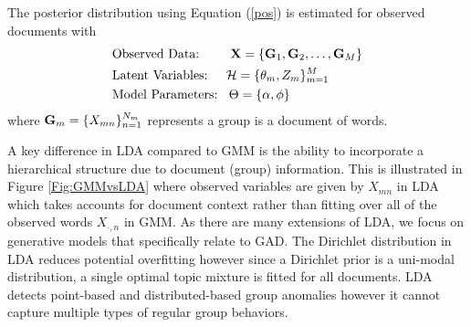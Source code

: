  The  posterior distribution using Equation (\ref{pos}) is estimated for observed documents   with 
 \begin{align*}
& \mbox{Observed Data:  \;\; \quad}  {\bf X}= \{{\bf G}_{1},{\bf G}_{2},\dots,{\bf G}_{M} \}\\
 & \mbox{Latent Variables: \quad}    \mathcal{H}=\{\theta_{m},Z_{m} \}_{m=1}^M  \\
 & \mbox{Model Parameters: \;\,}  \Theta=\{\alpha,\phi\} 
 \end{align*} 
   where ${\bf G}_{m} = \{ X_{mn} \}_{n=1}^{N_{m}}$ represents a group is a document of words.    
 
 
  A key difference in LDA compared to GMM is  the ability to incorporate a hierarchical structure due to document (group) information. This is illustrated in Figure \ref{Fig:GMMvsLDA} where observed variables are given by $X_{mn}$ in LDA which takes accounts for document context rather than fitting over all of the observed words $X_{\cdot,n}$ in GMM.  %
As there are many extensions of LDA, we focus on generative models that  specifically relate to  GAD. %
The Dirichlet distribution in LDA reduces potential overfitting however since a Dirichlet prior is a uni-modal distribution,  a single optimal topic mixture is fitted for all documents. LDA detects point-based and  distributed-based group anomalies however  it cannot capture multiple types of regular group behaviors.



